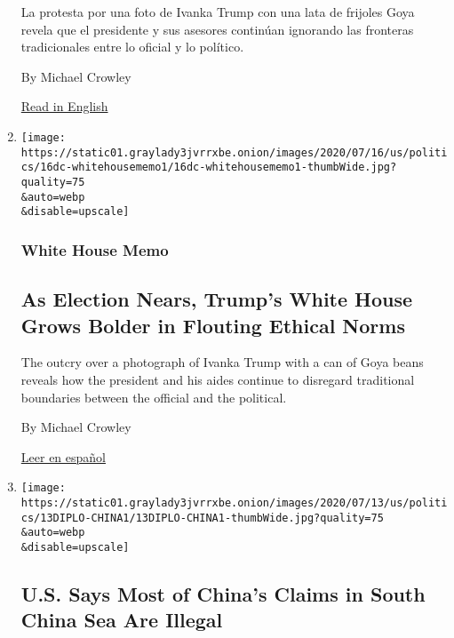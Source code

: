 \begin{enumerate}
  La protesta por una foto de Ivanka Trump con una lata de frijoles Goya
  revela que el presidente y sus asesores continúan ignorando las
  fronteras tradicionales entre lo oficial y lo político.

  By Michael Crowley

  \href{https://www.nytimes3xbfgragh.onion/2020/07/16/us/politics/trump-goya-ivanka.html}{Read
  in English}
\item
  \href{/2020/07/16/us/politics/trump-goya-ivanka.html}{}

  \texttt{[image: https://static01.graylady3jvrrxbe.onion/images/2020/07/16/us/politics/16dc-whitehousememo1/16dc-whitehousememo1-thumbWide.jpg?quality=75\\\&auto=webp\\\&disable=upscale]}

  \hypertarget{white-house-memo}{%
  \subsubsection{White House Memo}\label{white-house-memo}}

  \hypertarget{as-election-nears-trumps-white-house-grows-bolder-in-flouting-ethical-norms}{%
  \subsection{As Election Nears, Trump's White House Grows Bolder in
  Flouting Ethical
  Norms}\label{as-election-nears-trumps-white-house-grows-bolder-in-flouting-ethical-norms}}

  The outcry over a photograph of Ivanka Trump with a can of Goya beans
  reveals how the president and his aides continue to disregard
  traditional boundaries between the official and the political.

  By Michael Crowley

  \href{https://www.nytimes3xbfgragh.onion/es/2020/07/16/espanol/estados-unidos/goya-trump-ivanka.html}{Leer
  en español}
\item
  \href{/2020/07/13/world/asia/south-china-sea-pompeo.html}{}

  \texttt{[image: https://static01.graylady3jvrrxbe.onion/images/2020/07/13/us/politics/13DIPLO-CHINA1/13DIPLO-CHINA1-thumbWide.jpg?quality=75\\\&auto=webp\\\&disable=upscale]}

  \hypertarget{us-says-most-of-chinas-claims-in-south-china-sea-are-illegal}{%
  \subsection{U.S. Says Most of China's Claims in South China Sea Are
  Illegal}\label{us-says-most-of-chinas-claims-in-south-china-sea-are-illegal}}


\end{enumerate}
